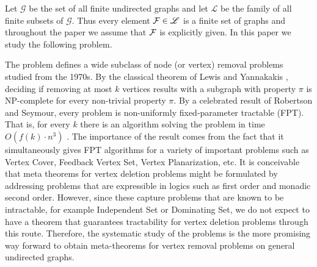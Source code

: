 

 Let $\mathscr{G}$ be the set of all finite undirected graphs and let $\mathscr{L}$ be the family of all finite subsets of  $\mathscr{G}$.
  Thus   every element ${\cal F} \in \mathscr{L}$ is a finite set of graphs and
throughout the paper we assume that  ${\cal F} $ is explicitly given.   In this paper we study the following \fd{} problem. 


\smallskip

 
 


\smallskip

\noindent 
The \fd{} problem defines  a wide subclass of node (or vertex) removal problems studied from the 1970s. By the classical theorem of  Lewis and Yannakakis  \cite{LewisY80}, deciding if  removing at most $k$ vertices results with a subgraph with property $\pi$ is  NP-complete for every non-trivial property $\pi$.
By a celebrated result of Robertson and Seymour, every \fd{} problem is non-uniformly  fixed-parameter tractable (FPT). 
That is, for every $k$ there is an algorithm solving the problem  in time  $O(f(k) \cdot n^3)$ \cite{RobertsonS13}.  The 
importance of the result comes from the fact that it simultaneously gives FPT algorithms for a variety of important 
problems such as {\sc Vertex Cover}, {\sc Feedback Vertex Set}, {\sc Vertex Planarization},  etc.  
It is conceivable that meta theorems for vertex deletion problems might be formulated by addressing problems that are expressible in logics such as first order and monadic second order. However, since these capture problems that are known 
to be intractable, for example {\sc Independent Set} or {\sc Dominating Set}, we do not expect to have a theorem 
that guarantees tractability for vertex deletion problems through this route. Therefore, 
the systematic study of the \fd{} problems is the more promising way forward to obtain meta-theorems 
for vertex removal problems on general undirected graphs.


